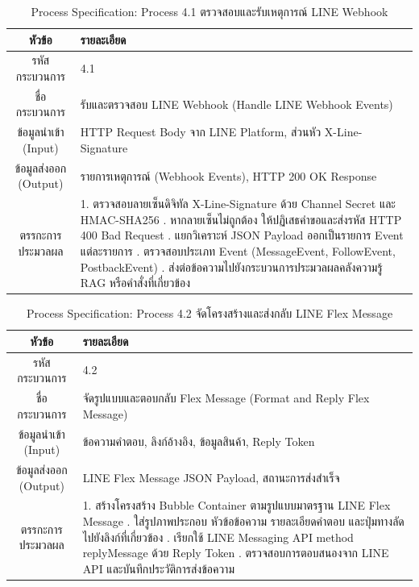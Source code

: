 \begin{table}[htbp]
\centering
\caption{Process Specification: Process 4.1 ตรวจสอบและรับเหตุการณ์ LINE Webhook}
\label{tab3:pspec4_1}
\begin{tabularx}{\textwidth}{| c | L |}
\hline
\textbf{หัวข้อ} & \textbf{รายละเอียด} \\ \hline
รหัสกระบวนการ & 4.1 \\ \hline
ชื่อกระบวนการ & รับและตรวจสอบ LINE Webhook (Handle LINE Webhook Events) \\ \hline
ข้อมูลนำเข้า (Input) & HTTP Request Body จาก LINE Platform, ส่วนหัว X-Line-Signature \\ \hline
ข้อมูลส่งออก (Output) & รายการเหตุการณ์ (Webhook Events), HTTP 200 OK Response \\ \hline
ตรรกะการประมวลผล & 1. ตรวจสอบลายเซ็นดิจิทัล X-Line-Signature ด้วย Channel Secret และ HMAC-SHA256 . หากลายเซ็นไม่ถูกต้อง ให้ปฏิเสธคำขอและส่งรหัส HTTP 400 Bad Request . แยกวิเคราะห์ JSON Payload ออกเป็นรายการ Event แต่ละรายการ . ตรวจสอบประเภท Event (MessageEvent, FollowEvent, PostbackEvent) . ส่งต่อข้อความไปยังกระบวนการประมวลผลคลังความรู้ RAG หรือคำสั่งที่เกี่ยวข้อง \\ \hline
\end{tabularx}
\end{table}

\begin{table}[htbp]
\centering
\caption{Process Specification: Process 4.2 จัดโครงสร้างและส่งกลับ LINE Flex Message}
\label{tab3:pspec4_2}
\begin{tabularx}{\textwidth}{| c | L |}
\hline
\textbf{หัวข้อ} & \textbf{รายละเอียด} \\ \hline
รหัสกระบวนการ & 4.2 \\ \hline
ชื่อกระบวนการ & จัดรูปแบบและตอบกลับ Flex Message (Format and Reply Flex Message) \\ \hline
ข้อมูลนำเข้า (Input) & ข้อความคำตอบ, ลิงก์อ้างอิง, ข้อมูลสินค้า, Reply Token \\ \hline
ข้อมูลส่งออก (Output) & LINE Flex Message JSON Payload, สถานะการส่งสำเร็จ \\ \hline
ตรรกะการประมวลผล & 1. สร้างโครงสร้าง Bubble Container ตามรูปแบบมาตรฐาน LINE Flex Message . ใส่รูปภาพประกอบ หัวข้อข้อความ รายละเอียดคำตอบ และปุ่มทางลัดไปยังลิงก์ที่เกี่ยวข้อง . เรียกใช้ LINE Messaging API method replyMessage ด้วย Reply Token . ตรวจสอบการตอบสนองจาก LINE API และบันทึกประวัติการส่งข้อความ \\ \hline
\end{tabularx}
\end{table}

